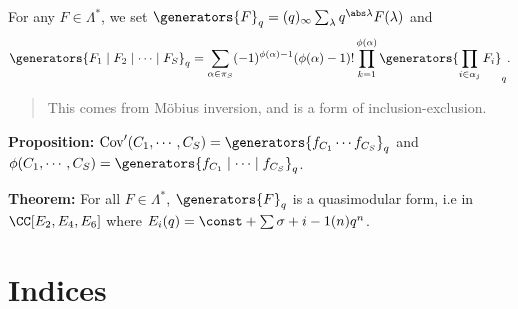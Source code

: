 For any \(F\in \Lambda^*\), we set
\(\generators{F}_q = (q)_\infty \sum_\lambda q^{\abs \lambda} F(\lambda)\)
and
\begin{align*}
\generators{F_1 \mid F_2 \mid \cdots \mid F_S}_q = \sum_{\alpha\in \pi_S} (-1)^{\phi(\alpha) - 1} (\phi(\alpha) - 1)! \prod_{k=1}^{\phi(\alpha)} \generators{\prod_{i\in\alpha_j} F_i}_q
.\end{align*}

\begin{quote}
This comes from Möbius inversion, and is a form of inclusion-exclusion.
\end{quote}

\textbf{Proposition:}
\(\mathrm{Cov}'(C_1, \cdots, C_S) = \generators{f_{C_1} \cdots f_{C_S}}_q\)
and
\(\phi(C_1, \cdots, C_S) = \generators{f_{C_1} \mid \cdots \mid f_{C_S}}_q\).

\textbf{Theorem:} For all \(F\in \Lambda^*\), \(\generators{F}_q\) is a
quasimodular form, i.e in \(\CC[E_2, E_4, E_6]\) where
\(E_i(q) = \const + \sum \sigma+{i-1} (n) q^n\).

\newpage

\newpage
\section{Indices}

\renewcommand{\listtheoremname}{Definitions}
\listoftheorems[ignoreall,show={definition}, numwidth=3.5em]

\renewcommand{\listtheoremname}{Theorems}
\listoftheorems[ignoreall,show={theorem,proposition}, numwidth=3.5em]

\renewcommand{\listtheoremname}{Exercises}
\listoftheorems[ignoreall,show={exercise}, numwidth=3.5em]

\listoffigures


\printbibliography[title=Bibliography]



